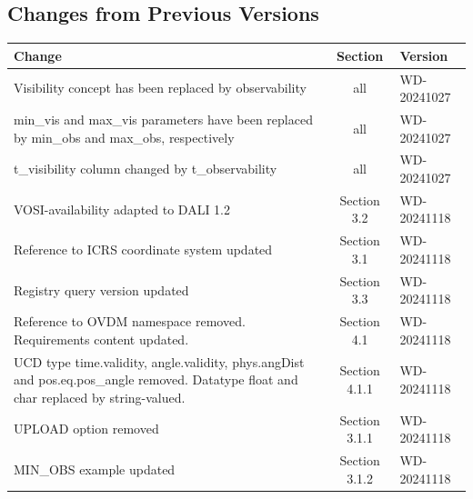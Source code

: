 \documentclass[11pt,a4paper]{ivoatex/ivoa}
\begin{document}
\begin{appendices}
\section{Changes from Previous Versions}

\begin{table}[h]

\begin{tabularx}{\linewidth}{|L|c|l|}
\hline
\textbf{Change} & \textbf{Section} & \textbf{Version} \\
\hline
Visibility concept has been replaced by observability & all & WD-20241027 \\
\hline
min\_vis and max\_vis parameters have been replaced by 
min\_obs and max\_obs, respectively & all  & WD-20241027 \\
\hline
t\_visibility column changed by t\_observability & all & WD-20241027 \\
\hline
VOSI-availability adapted to DALI 1.2 & Section 3.2 & WD-20241118 \\
\hline
Reference to ICRS coordinate system updated & Section 3.1 & WD-20241118 \\
\hline
Registry query version updated & Section 3.3 & WD-20241118 \\
\hline
Reference to OVDM namespace removed. Requirements content updated. & Section 4.1 & WD-20241118 \\
\hline
UCD type time.validity, angle.validity, phys.angDist and pos.eq.pos\_angle removed. Datatype float and char replaced by string-valued. & Section 4.1.1 & WD-20241118 \\
\hline
UPLOAD option removed & Section 3.1.1 &  WD-20241118 \\
\hline
MIN\_OBS example updated & Section 3.1.2 &  WD-20241118 \\
\hline
\end{tabularx}
\end{table}


\end{appendices}
\end{document}
